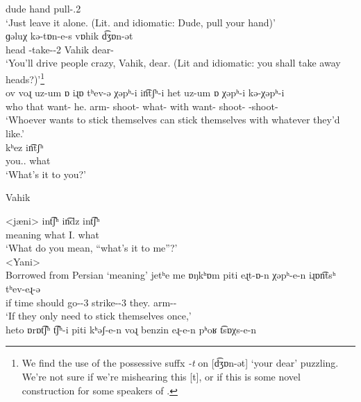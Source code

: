 \begin{exe}
\begin{xlist}
	 dude   hand   pull-{\imp}.2{\sg} \\
	  \trans `Just leave it alone. (Lit. and idiomatic: Dude, pull your hand)' \\
\ex \gll  ɡəluχ   kə-tɒn-e-s   vɒhik   d͡ʒɒn-ət  \\
 head   {\fut}-take-{\thgloss}-2{\sg}   Vahik   dear-{\possSsg}  \\
 \trans `You'll drive people crazy, Vahik, dear. (Lit and idiomatic: you shall take away heads?)'\footnote{We find the use of the possessive suffx \textit{-t} on [d͡ʒɒn-ət] `your dear' puzzling. We're not sure if we're mishearing this [t], or if this is some novel construction for some speakers of {\iaAbbre}. } \\ 
\ex \gll  ov voɻ uz-um ɒ   iɻɒ   tʰev-ə   χəpʰ-i in͡tʃʰ-i het   uz-um ɒ   χəpʰ-i   kə-χəpʰ-i  \\
 who that want-{\impfcvb} {\auxgloss}   he.{\gen}   arm-{}   shoot-{\thgloss} what-{\gen} with   want-{\impfcvb} {\auxgloss}   shoot-{\thgloss}   {\fut}-shoot-{\thgloss}  \\
 \trans `Whoever wants to stick themselves can stick themselves with whatever they’d like.' \\
\ex \gll  kʰez in͡tʃʰ  \\ 
 you.{\sg}.{\dat} what  \\
\trans `What’s it to you?' \\
\end{xlist}
\ex Vahik\largerpage
\begin{xlist}
	\ex \gll  <jæni> int͡ʃʰ   in͡dz int͡ʃʰ  \\ 
	 meaning what   I.{\dat} what \\
	\trans `What do you mean, “what’s it to me”?' \\
<Yani>  \\
Borrowed from  Persian   `meaning'
\ex \gll  jetʰe   me ɒŋkʰɒm   piti eɻt-ɒ-n   χəpʰ-e-n   iɻɒn͡tsʰ   tʰev-eɻ-ə  \\
 if   {\indf} time   should go-{\thgloss}-3{\pl}   strike-{\thgloss}-3{\pl}   they.{\gen}   arm-{\pl}-{} \\
\trans `If they only need to stick themselves once,' \\ 
\ex \gll  heto   ɒrɒt͡ʃʰ   t͡ʃʰ-i   piti   kʰəʃ-e-n   voɻ   benzin   eɻ-e-n   pʰoʁ   t͡sɒχs-e-n  \\

\end{xlist}
\end{exe}
